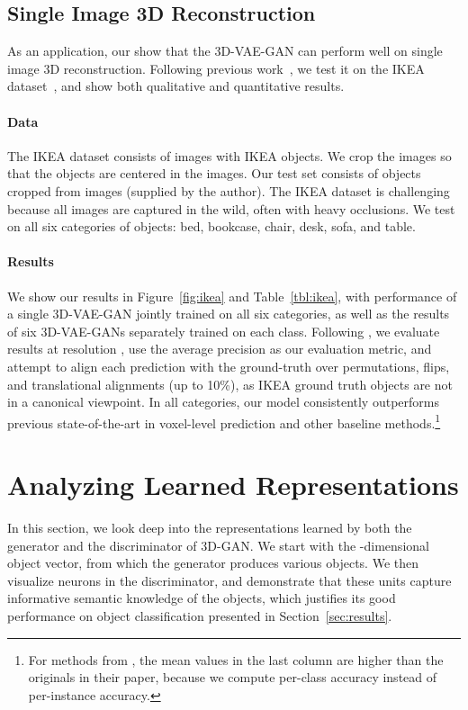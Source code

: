 \documentclass{article}
\newcommand{\sect}[1]{Section~\ref{#1}}
\newcommand{\fig}[1]{Figure~\ref{#1}}
\newcommand{\tbl}[1]{Table~\ref{#1}}
\newcommand{\model}{3D-GAN\xspace}
\newcommand{\vaemodel}{3D-VAE-GAN\xspace}
\newcommand{\vaemodels}{3D-VAE-GANs\xspace}
\newcommand{\myparagraph}[1]{\vspace{-10pt}\paragraph{#1}}
\newcommand{\presection}{\vspace{-8pt}}
\newcommand{\postsection}{\vspace{-8pt}}
\newcommand{\presubsection}{\vspace{-8pt}}
\newcommand{\postsubsection}{\vspace{-6pt}}
\begin{document}
\presubsection
\subsection{Single Image 3D Reconstruction}
\postsubsection

As an application, our show that the \vaemodel can perform well on single image 3D reconstruction. Following previous work~\citep{girdhar2016learning}, we test it on the IKEA dataset~\citep{ikea}, and show both qualitative and quantitative results.

\myparagraph{Data} 
The IKEA dataset consists of images with IKEA objects. We crop the images so that the objects are centered in the images. Our test set consists of  objects cropped from  images (supplied by the author). The IKEA dataset is challenging because all images are captured in the wild, often with heavy occlusions. We test on all six categories of objects: bed, bookcase, chair, desk, sofa, and table.

\myparagraph{Results} We show our results in \fig{fig:ikea} and \tbl{tbl:ikea}, with performance of a single \vaemodel jointly trained on all six categories, as well as the results of six \vaemodels separately trained on each class. Following \cite{girdhar2016learning}, we evaluate results at resolution , use the average precision as our evaluation metric, and attempt to align each prediction with the ground-truth over permutations, flips, and translational alignments (up to 10\%), as IKEA ground truth objects are not in a canonical viewpoint. 
In all categories, our model consistently outperforms previous state-of-the-art in voxel-level prediction and other baseline methods.\footnote{For methods from \cite{girdhar2016learning}, the mean values in the last column are higher than the originals in their paper, because we compute per-class accuracy instead of per-instance accuracy.}

\presection
\section{Analyzing Learned Representations}
\label{sec:analysis}
\postsection

In this section, we look deep into the representations learned by both the generator and the discriminator of \model. We start with the -dimensional object vector, from which the generator produces various objects. We then visualize neurons in the discriminator, and demonstrate that these units capture informative semantic knowledge of the objects, which justifies its good performance on object classification presented in \sect{sec:results}.
\end{document}
